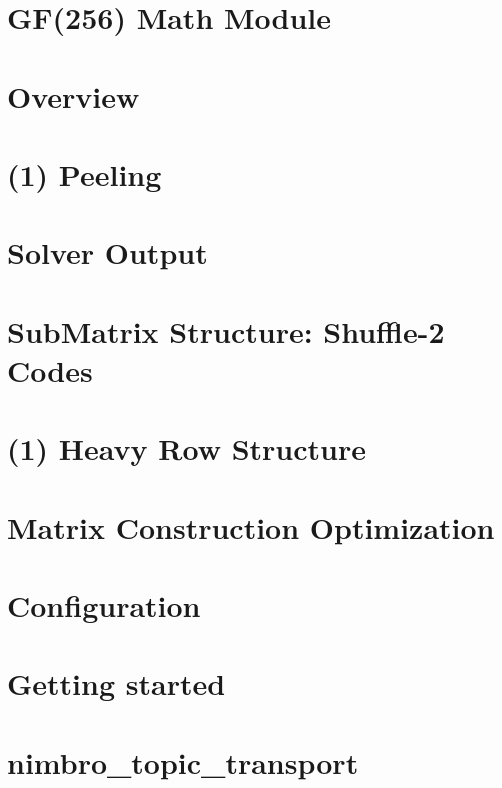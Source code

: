 \let\mypdfximage\pdfximage\def\pdfximage{\immediate\mypdfximage}\documentclass[twoside]{book}
\newcommand{\+}{\discretionary{\mbox{\scriptsize$\hookleftarrow$}}{}{}}
\begin{document}
\chapter{GF(256) Math Module}
\label{GF256}

\chapter{Overview}
\label{Codec}

\chapter{(1) Peeling}
\label{Stage}

\chapter{Solver Output}
\label{Peeling}

\chapter{Sub\+Matrix Structure\+: Shuffle-\/2 Codes}
\label{Dense}

\chapter{(1) Heavy Row Structure}
\label{O}

\chapter{Matrix Construction Optimization}
\label{GE}

\chapter{Configuration}
\label{md_nimbro_network_nimbro_topic_transport_doc_configuration}

\chapter{Getting started}
\label{md_nimbro_network_nimbro_topic_transport_doc_getting_started}

\chapter{nimbro\+\_\+topic\+\_\+transport}
\label{md_nimbro_network_nimbro_topic_transport_README}

\end{document}
